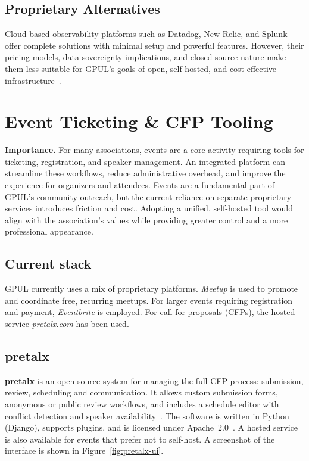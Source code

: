 \subsection*{Proprietary Alternatives}
Cloud-based observability platforms such as Datadog, New Relic, and Splunk offer complete solutions with minimal setup and powerful features. However, their pricing models, data sovereignty implications, and closed-source nature make them less suitable for GPUL's goals of open, self-hosted, and cost-effective infrastructure~\cite{datadog-web}.

\section{Event Ticketing \& CFP Tooling}

\textbf{Importance.} For many associations, events are a core activity requiring tools for ticketing, registration, and speaker management. An integrated platform can streamline these workflows, reduce administrative overhead, and improve the experience for organizers and attendees. Events are a fundamental part of GPUL's community outreach, but the current reliance on separate proprietary services introduces friction and cost. Adopting a unified, self-hosted tool would align with the association's values while providing greater control and a more professional appearance.

\subsection*{Current stack}
GPUL currently uses a mix of proprietary platforms. \emph{Meetup} is used to promote and coordinate free, recurring meetups. For larger events requiring registration and payment, \emph{Eventbrite} is employed. For call-for-proposals (CFPs), the hosted service \emph{pretalx.com} has been used.

\subsection*{pretalx}
\textbf{pretalx} is an open-source system for managing the full CFP process: submission, review, scheduling and communication. It allows custom submission forms, anonymous or public review workflows, and includes a schedule editor with conflict detection and speaker availability~\cite{pretalx-docs}. The software is written in Python (Django), supports plugins, and is licensed under Apache~2.0~\cite{pretalx-license}. A hosted service is also available for events that prefer not to self-host. A screenshot of the interface is shown in Figure~\ref{fig:pretalx-ui}.

